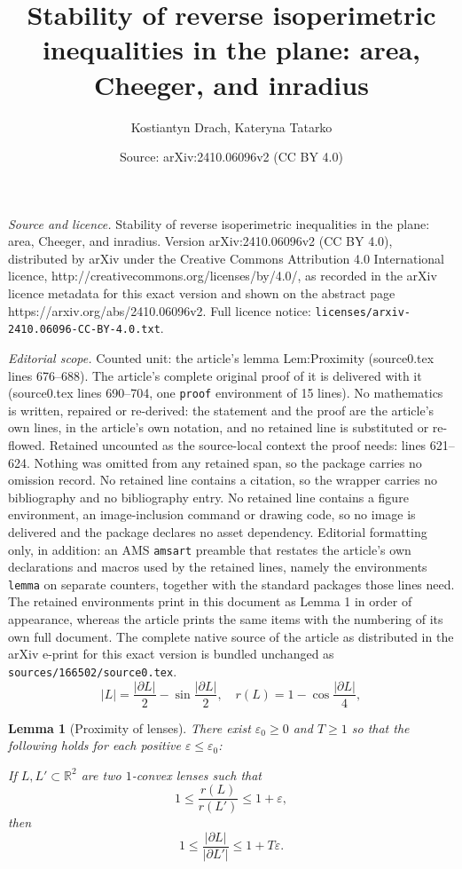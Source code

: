 \documentclass[10pt,a4paper]{amsart}
\title{Stability of reverse isoperimetric inequalities in the plane: area, Cheeger, and inradius}
\author{Kostiantyn Drach, Kateryna Tatarko}
\date{Source: arXiv:2410.06096v2 (CC BY 4.0)}
\newtheorem{lemma}{Lemma}
\newcommand{\R}{\mathbb{R}}
\newcommand{\eps}{\varepsilon}
\renewcommand{\ge}{\geqslant}
\renewcommand{\le}{\leqslant}
\begin{document}
\maketitle

\noindent\emph{Source and licence.} Stability of reverse isoperimetric inequalities in the plane: area, Cheeger, and inradius. Version arXiv:2410.06096v2 (CC BY 4.0), distributed by arXiv under the Creative Commons Attribution 4.0 International licence, http://creativecommons.org/licenses/by/4.0/, as recorded in the arXiv licence metadata for this exact version and shown on the abstract page https://arxiv.org/abs/2410.06096v2. Full licence notice: \texttt{licenses/arxiv-2410.06096-CC-BY-4.0.txt}.\par\smallskip

\noindent\textit{Editorial scope.} Counted unit: the article's lemma Lem:Proximity (source0.tex lines 676--688). The article's complete original proof of it is delivered with it (source0.tex lines 690--704, one \texttt{proof} environment of 15 lines). No mathematics is written, repaired or re-derived: the statement and the proof are the article's own lines, in the article's own notation, and no retained line is substituted or re-flowed.  Retained uncounted as the source-local context the proof needs: lines 621--624.  Nothing was omitted from any retained span, so the package carries no omission record.  No retained line contains a citation, so the wrapper carries no bibliography and no bibliography entry.  No retained line contains a figure environment, an image-inclusion command or drawing code, so no image is delivered and the package declares no asset dependency.  Editorial formatting only, in addition: an AMS \texttt{amsart} preamble that restates the article's own declarations and macros used by the retained lines, namely the environments \texttt{lemma} on separate counters, together with the standard packages those lines need.  The retained environments print in this document as Lemma 1 in order of appearance, whereas the article prints the same items with the numbering of its own full document.  The complete native source of the article as distributed in the arXiv e-print for this exact version is bundled unchanged as \texttt{sources/166502/source0.tex}.
\begin{equation}
\label{Eq:LensBasic}
|L| = \frac{|\partial L|}{2} - \sin \frac{|\partial L|}{2}, \quad r(L) = 1 - \cos\frac{|\partial L|}{4}, 
\end{equation}

\begin{lemma}[Proximity of lenses]
\label{Lem:Proximity}
There exist $\eps_0 \ge 0$ and $T \ge 1$ so that the following holds for each positive $\eps \le \eps_0$: 

If $L, L' \subset \R^2$ are two $1$-convex lenses such that 
\[
1 \le \frac{r(L)}{r(L')} \le 1 + \eps,
\]
then 
\[
1 \le \frac{|\partial L|}{|\partial L'|} \le 1 + T \eps.
\]
\end{lemma}
\end{document}
